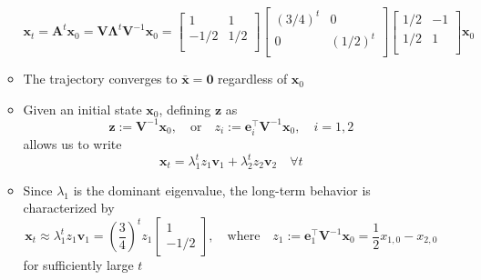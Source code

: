 \documentclass[12pt,a4paper]{article}
\begin{document}
\begin{itemize}
\begin{itemize}
\begin{equation}
        \bm{x}_{t} =
        \bm{A}^{t}\bm{x}_{0}
        =
        \bm{V}\bm{\Lambda}^{t}\bm{V}^{-1}\bm{x}_{0}
        =
      \begin{bmatrix}
        1 & 1 \\
        -1/2 & 1/2 \\
      \end{bmatrix}
      \begin{bmatrix}
        (3/4)^{t} & 0 \\
        0 & (1/2)^{t} \\
      \end{bmatrix}
      \begin{bmatrix}
        1/2 & -1 \\
        1/2 & 1 \\
      \end{bmatrix}
      \bm{x}_{0}
      \end{equation}
    \item The trajectory converges to $\bar{\bm{x}}=\bm{0}$
      regardless of $\bm{x}_{0}$
    \item Given an initial state $\bm{x}_{0}$,
      defining $\bm{z}$ as
      \begin{equation}\nonumber%
        \bm{z} := \bm{V}^{-1}\bm{x}_{0},
        \quad\text{or}\quad
        z_{i} := \bm{e}_{i}^{\top}\bm{V}^{-1}\bm{x}_{0},
        \quad i = 1, 2
      \end{equation}
      allows us to write
    \begin{equation}\nonumber%
      \bm{x}_{t}
      =
      \lambda_{1}^{t}z_{1}\bm{v}_{1}
      +
      \lambda_{2}^{t}z_{2}\bm{v}_{2}
      \quad \forall t
    \end{equation}
    \item Since $\lambda_{1}$ is the dominant eigenvalue,
      the long-term behavior is characterized by
    \begin{equation}\nonumber%
      \bm{x}_{t}
      \approx
      \lambda_{1}^{t}z_{1}\bm{v}_{1}
      =
      \left(\frac{3}{4}\right)^{t}z_{1}
      \begin{bmatrix}
        1 \\ -1/2
      \end{bmatrix},
      \quad\text{where}\quad
      z_{1}:=\bm{e}_{1}^{\top}\bm{V}^{-1}\bm{x}_{0}
      = \frac{1}{2}x_{1,0} - x_{2,0}
    \end{equation}
    for sufficiently large $t$
  \end{itemize}


\end{itemize}
\end{document}
